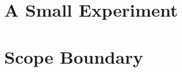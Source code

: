 \section{A Small Experiment}
\label{sec:bias-experiment}

\section{Scope Boundary}
\label{sec:bias-scope}
